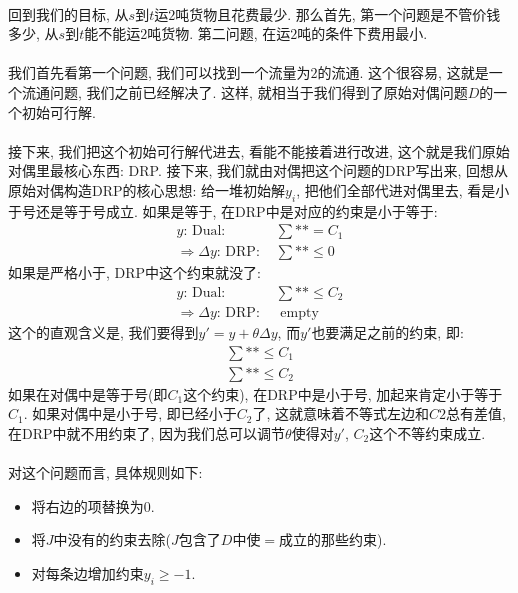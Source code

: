         \paragraph{}回到我们的目标, 从$s$到$t$运$2$吨货物且花费最少. 那么首先, 第一个问题是不管价钱多少, 从$s$到$t$能不能运$2$吨货物. 第二问题, 在运$2$吨的条件下费用最小.
        \paragraph{}我们首先看第一个问题, 我们可以找到一个流量为$2$的流通. 这个很容易, 这就是一个流通问题, 我们之前已经解决了. 这样, 就相当于我们得到了原始对偶问题$D$的一个初始可行解.
        \paragraph{}接下来, 我们把这个初始可行解代进去, 看能不能接着进行改进, 这个就是我们原始对偶里最核心东西: DRP. 接下来, 我们就由对偶把这个问题的DRP写出来, 回想从原始对偶构造DRP的核心思想: 给一堆初始解$y_i$, 把他们全部代进对偶里去, 看是小于号还是等于号成立. 如果是等于, 在DRP中是对应的约束是小于等于:
        \begin{align*}
        y \text{: Dual: } & \sum ** = C_1 \\
        \Rightarrow \Delta y \text{: DRP: } & \sum ** \leq 0
        \end{align*}
如果是严格小于, DRP中这个约束就没了:
        \begin{align*}
        y \text{: Dual: } & \sum ** \leq C_2 \\
        \Rightarrow \Delta y \text{: DRP: } & \text{ empty}
        \end{align*}
这个的直观含义是, 我们要得到$y' = y + \theta \Delta y$, 而$y'$也要满足之前的约束, 即:
        \begin{align*}
            \sum ** \leq  C_1 \\
            \sum ** \leq  C_2
        \end{align*}
如果在对偶中是等于号(即$C_1$这个约束), 在DRP中是小于号, 加起来肯定小于等于$C_1$. 如果对偶中是小于号, 即已经小于$C_2$了, 这就意味着不等式左边和$C2$总有差值, 在DRP中就不用约束了, 因为我们总可以调节$\theta$使得对$y'$, $C_2$这个不等约束成立.
       \paragraph{}对这个问题而言, 具体规则如下: 
\begin{itemize}
 \item 将右边的项替换为$0$.
 \item 将$J$中没有的约束去除($J$包含了$D$中使$=$成立的那些约束).
 \item 对每条边增加约束$y_{i}  \geq -1$.
\end{itemize}
